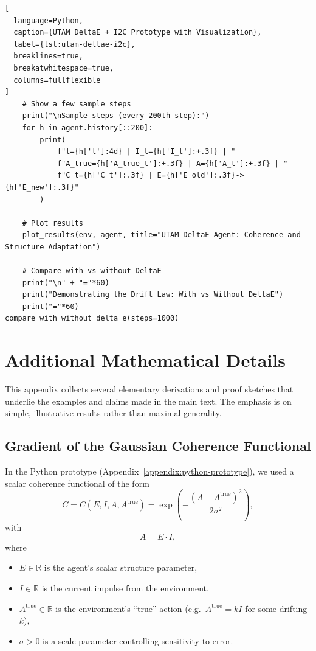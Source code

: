 \documentclass[12pt,a4paper]{report}
\begin{document}
\begin{lstlisting}[
  language=Python,
  caption={UTAM DeltaE + I2C Prototype with Visualization},
  label={lst:utam-deltae-i2c},
  breaklines=true,
  breakatwhitespace=true,
  columns=fullflexible
]
    # Show a few sample steps
    print("\nSample steps (every 200th step):")
    for h in agent.history[::200]:
        print(
            f"t={h['t']:4d} | I_t={h['I_t']:+.3f} | "
            f"A_true={h['A_true_t']:+.3f} | A={h['A_t']:+.3f} | "
            f"C_t={h['C_t']:.3f} | E={h['E_old']:.3f}->{h['E_new']:.3f}"
        )
    
    # Plot results
    plot_results(env, agent, title="UTAM DeltaE Agent: Coherence and Structure Adaptation")
    
    # Compare with vs without DeltaE
    print("\n" + "="*60)
    print("Demonstrating the Drift Law: With vs Without DeltaE")
    print("="*60)
compare_with_without_delta_e(steps=1000)
\end{lstlisting}


\chapter{Additional Mathematical Details}
\label{appendix:math-details}

This appendix collects several elementary derivations and proof sketches that underlie the examples and claims made in the main text. The emphasis is on simple, illustrative results rather than maximal generality.

\section{Gradient of the Gaussian Coherence Functional}

In the Python prototype (Appendix~\ref{appendix:python-prototype}), we used a scalar coherence functional of the form
\begin{equation}
    C = C(E, I, A, A^{\mathrm{true}}) 
      = \exp\!\left( -\frac{(A - A^{\mathrm{true}})^2}{2\sigma^2} \right),
    \label{eq:gaussian-coherence}
\end{equation}
with
\begin{equation}
    A = E \cdot I,
\end{equation}
where
\begin{itemize}[leftmargin=2em]
    \item \(E \in \mathbb{R}\) is the agent's scalar structure parameter,
    \item \(I \in \mathbb{R}\) is the current impulse from the environment,
    \item \(A^{\mathrm{true}} \in \mathbb{R}\) is the environment's ``true'' action (e.g.\ \(A^{\mathrm{true}} = k I\) for some drifting \(k\)),
    \item \(\sigma > 0\) is a scale parameter controlling sensitivity to error.
\end{itemize}
\end{document}

